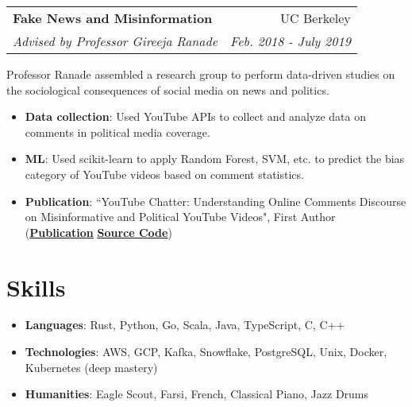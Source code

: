 \documentclass[letterpaper,11pt]{article}
\makeatletter
\newcommand{\resumeItem}[2]{
  \item\small{
    \textbf{#1}{: #2 \vspace{-2pt}}
  }
}
\newcommand{\resumeSubheading}[4]{
  \vspace{-1pt}
    \begin{tabular*}{0.97\textwidth}{l@{\extracolsep{\fill}}r}
      \textbf{#1} & #2 \\
      \textit{\small#3} & \textit{\small #4} \\
    \end{tabular*}\vspace{-5pt}
}
\newcommand{\resumeSubItem}[2]{\resumeItem{#1}{#2}\vspace{-4pt}}
\newcommand{\resumeSubHeadingListStart}{\begin{itemize}[leftmargin=*]}
\newcommand{\resumeSubHeadingListEnd}{\end{itemize}}
\makeatother
\begin{document}
    \vspace{5mm}
    
    \resumeSubheading
      {Fake News and Misinformation}{UC Berkeley}
      {Advised by Professor Gireeja Ranade}{Feb. 2018 - July 2019}
      
    \vspace{4mm}
      Professor Ranade assembled a research group to perform data-driven studies on the sociological consequences of social media on news and politics.
      
  \resumeSubHeadingListStart
    \resumeSubItem{Data collection}
      {Used YouTube APIs to collect and analyze data on comments in political media coverage.}
    \resumeSubItem{ML} {Used scikit-learn to apply Random Forest, SVM, etc. to predict the bias category of YouTube videos based on comment statistics.}
    \resumeSubItem{Publication} {``YouTube Chatter: Understanding Online Comments Discourse on Misinformative and Political YouTube Videos", First Author (\href{https://arxiv.org/abs/1907.00435}{\underline{\textbf{Publication}}} \textbar \hspace{0.5mm} \href{https://github.com/aarashy/YouTubeComments}{\underline{\textbf{Source Code}}})}
    \resumeSubHeadingListEnd

    \vspace{4mm}

\section{Skills}
 \resumeSubHeadingListStart
    \resumeSubItem{Languages}{Rust, Python, Go, Scala, Java, TypeScript, C, C++}
    \resumeSubItem{Technologies}{AWS, GCP, Kafka, Snowflake, PostgreSQL,  Unix, Docker, Kubernetes (deep mastery)}
    \resumeSubItem{Humanities}{Eagle Scout,  Farsi, French, Classical Piano, Jazz Drums}
 \resumeSubHeadingListEnd


\end{document}
